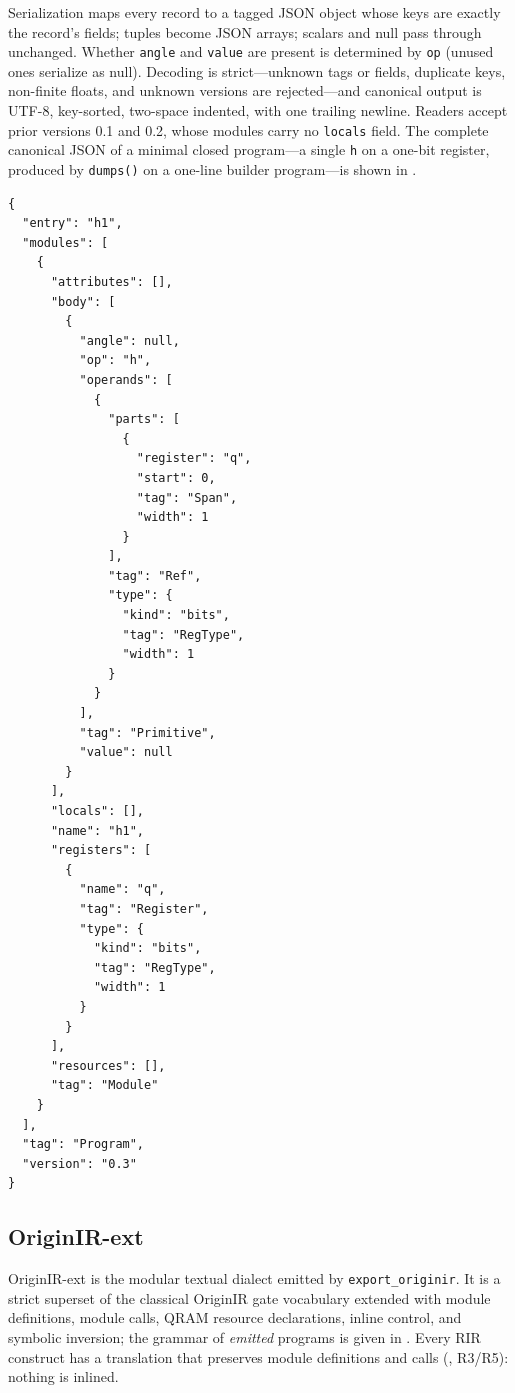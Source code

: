 Serialization maps every record to a tagged JSON object whose keys are
exactly the record's fields; tuples become JSON arrays; scalars and null
pass through unchanged.  Whether \texttt{angle} and \texttt{value} are
present is determined by \texttt{op} (unused ones serialize as null).
Decoding is strict---unknown tags or fields, duplicate keys, non-finite
floats, and unknown versions are rejected---and canonical output is UTF-8,
key-sorted, two-space indented, with one trailing newline.  Readers accept
prior versions 0.1 and 0.2, whose modules carry no \texttt{locals} field.
The complete canonical JSON of a minimal closed program---a single
\texttt{h} on a one-bit register, produced by
\texttt{dumps()} on a one-line builder program---is shown in
.

\begin{lstlisting}[style=pyqjson, caption={Canonical RIR 0.3 JSON (verbatim \texttt{dumps} output) of the module \texttt{h1\{q: Bits(1)\}} containing one \texttt{h}.  All fields are written, including nulls and empty tuples; keys are sorted.}, label={lst:rir-json}]
{
  "entry": "h1",
  "modules": [
    {
      "attributes": [],
      "body": [
        {
          "angle": null,
          "op": "h",
          "operands": [
            {
              "parts": [
                {
                  "register": "q",
                  "start": 0,
                  "tag": "Span",
                  "width": 1
                }
              ],
              "tag": "Ref",
              "type": {
                "kind": "bits",
                "tag": "RegType",
                "width": 1
              }
            }
          ],
          "tag": "Primitive",
          "value": null
        }
      ],
      "locals": [],
      "name": "h1",
      "registers": [
        {
          "name": "q",
          "tag": "Register",
          "type": {
            "kind": "bits",
            "tag": "RegType",
            "width": 1
          }
        }
      ],
      "resources": [],
      "tag": "Module"
    }
  ],
  "tag": "Program",
  "version": "0.3"
}
\end{lstlisting}

\subsection{OriginIR-ext}
\label{app:spec-originir}

OriginIR-ext is the modular textual dialect emitted by
\texttt{export\_originir}.  It is a strict superset of the classical
OriginIR gate vocabulary extended with module definitions, module calls,
QRAM resource declarations, inline control, and symbolic inversion; the
grammar of \emph{emitted} programs is given in .
Every RIR construct has a translation that preserves module definitions
and calls (, R3/R5): nothing is inlined.

